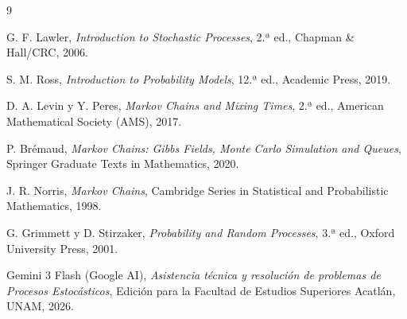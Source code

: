 \documentclass[10pt,a4paper]{article}
\begin{document}
\begin{thebibliography}{9}
    
    G. F. Lawler, 
    \textit{Introduction to Stochastic Processes}, 
    2.ª ed., Chapman \& Hall/CRC, 2006.

    S. M. Ross, 
    \textit{Introduction to Probability Models}, 
    12.ª ed., Academic Press, 2019.

    D. A. Levin y Y. Peres, 
    \textit{Markov Chains and Mixing Times}, 
    2.ª ed., American Mathematical Society (AMS), 2017.

    P. Brémaud, 
    \textit{Markov Chains: Gibbs Fields, Monte Carlo Simulation and Queues}, 
    Springer Graduate Texts in Mathematics, 2020.

    J. R. Norris, 
    \textit{Markov Chains}, 
    Cambridge Series in Statistical and Probabilistic Mathematics, 1998.

    G. Grimmett y D. Stirzaker, 
    \textit{Probability and Random Processes}, 
    3.ª ed., Oxford University Press, 2001.

Gemini 3 Flash (Google AI), 
\textit{Asistencia técnica y resolución de problemas de Procesos Estocásticos}, 
Edición para la Facultad de Estudios Superiores Acatlán, UNAM, 2026.
\end{thebibliography}
\end{document}
